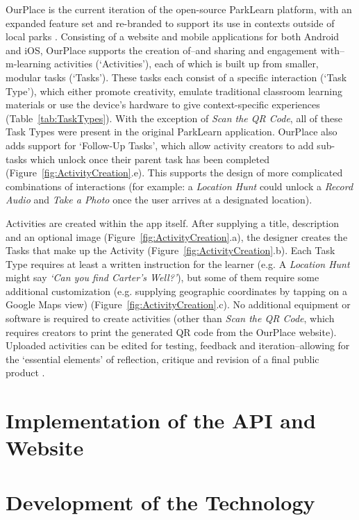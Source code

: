 OurPlace is the current iteration of the open-source ParkLearn platform, with an expanded feature set and re-branded to support its use in contexts outside of local parks \citep{Richardson2018a}. Consisting of a website and mobile applications for both Android and iOS, OurPlace supports the creation of--and sharing and engagement with--m-learning activities (`Activities'), each of which is built up from smaller, modular tasks (`Tasks'). These tasks each consist of a specific interaction (`Task Type'), which either promote creativity, emulate traditional classroom learning materials or use the device's hardware to give context-specific experiences (Table~\ref{tab:TaskTypes}). With the exception of \textit{Scan the QR Code}, all of these Task Types were present in the original ParkLearn application. OurPlace also adds support for `Follow-Up Tasks', which allow activity creators to add sub-tasks which unlock once their parent task has been completed (Figure~\ref{fig:ActivityCreation}.e). This supports the design of more complicated combinations of interactions (for example: a \textit{Location Hunt} could unlock a \textit{Record Audio} and \textit{Take a Photo} once the user arrives at a designated location).


Activities are created within the app itself. After supplying a title, description and an optional image (Figure~\ref{fig:ActivityCreation}.a), the designer creates the Tasks that make up the Activity (Figure~\ref{fig:ActivityCreation}.b). Each Task Type requires at least a written instruction for the learner (e.g. A \textit{Location Hunt} might say \textit{`Can you find Carter's Well?'}), but some of them require some additional customization (e.g. supplying geographic coordinates by tapping on a Google Maps view) (Figure~\ref{fig:ActivityCreation}.c). No additional equipment or software is required to create activities (other than \textit{Scan the QR Code}, which requires creators to print the generated QR code from the OurPlace website). Uploaded activities can be edited for testing, feedback and iteration--allowing for the `essential elements' of reflection, critique and revision of a final public product \citep{Larmer2015}. 

\section{Implementation of the API and Website}
\label{sec:ImplementationWeb}

\section{Development of the Technology}

